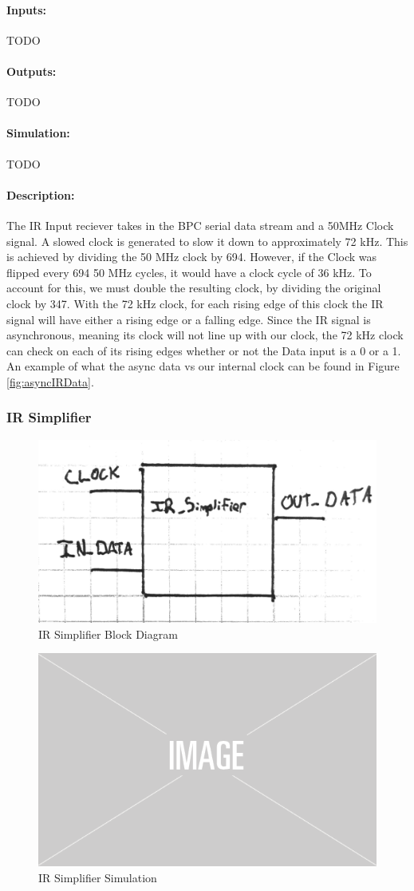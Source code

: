 \documentclass[]{article}
\begin{document}
\paragraph{Inputs:} TODO
\paragraph{Outputs:} TODO
\paragraph{Simulation:} TODO 
\paragraph{Description:} The IR Input reciever takes in the BPC serial data stream and a 50MHz Clock signal. A slowed clock is generated to slow it down to approximately 72 kHz.
This is achieved by dividing the 50 MHz clock by 694. However, if the Clock was flipped every 694 50 MHz cycles, it would have a clock cycle of 36 kHz. 
To account for this, we must double the resulting clock, by dividing the original clock by 347.
With the 72 kHz clock, for each rising edge of this clock the IR signal will have either a rising edge or a falling edge. 
Since the IR signal is asynchronous, meaning its clock will not line up with our clock, the 72 kHz clock can check on each of its rising edges whether or not the Data input is a 0 or a 1.
An example of what the async data vs our internal clock can be found in Figure \ref{fig:asyncIRData}.

\subsubsection{IR Simplifier}
\begin{figure}[H]\centering
    \includegraphics[width=0.6\linewidth]{figures/IR_Simplifier_Block.jpg}
    \caption{IR Simplifier Block Diagram}
    \label{fig:irSimplifierBlock}
\end{figure}
\begin{figure}[H]\centering
    \includegraphics[width=0.5\linewidth]{figures/placeholder.png}
    \caption{IR Simplifier Simulation}
    \label{fig:irSimplifierSim}
\end{figure}
\end{document}
